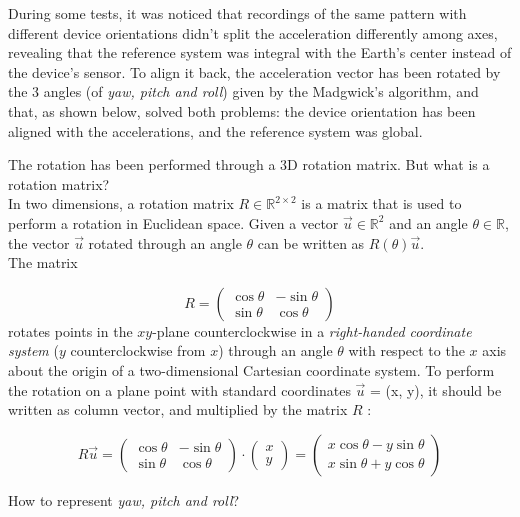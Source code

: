 During some tests, it was noticed that recordings of the same pattern with different device orientations didn't split the acceleration differently among axes, revealing that the reference system was integral with the Earth's center instead of the device's sensor. To align it back, the acceleration vector has been rotated by the 3 angles (of \textit{yaw, pitch and roll}) given by the Madgwick's algorithm, and that, as shown below, solved both problems: the device orientation has been aligned with the accelerations, and the reference system was global.
\bigbreak

The rotation has been performed through a 3D rotation matrix. But what is a rotation matrix?\\
In two dimensions, a rotation matrix $R \in \mathbb R^{2 \times 2}$ is a matrix that is used to perform a rotation in Euclidean space. Given a vector $\vec u \in \mathbb R^2$ and an angle $\theta \in \mathbb R$, the vector $\vec u$ rotated through an angle $\theta$ can be written as $R(\theta) \vec u$.\\
The matrix

\[
	R =
	{\begin{pmatrix}
		\cos \theta & -\sin \theta \\
		\sin \theta & \cos \theta
	\end{pmatrix}}
\]
rotates points in the $xy$-plane counterclockwise in a \textit{right-handed coordinate system} ($y$ counterclockwise from $x$) through an angle $\theta$ with respect to the $x$ axis about the origin of a two-dimensional Cartesian coordinate system. To perform the rotation on a plane point with standard coordinates $\vec u$ = (x, y), it should be written as column vector, and multiplied by the matrix $R$ \cite{WikipediaRotationM}:
\bigbreak

\[
	R \vec u =
	{\begin{pmatrix}
		\cos \theta &-\sin \theta \\
		\sin \theta &\cos \theta
	\end{pmatrix}}
	\cdot
	{\begin{pmatrix}
		x \\
		y
	\end{pmatrix}} =
	{\begin{pmatrix}
		x\cos \theta -y\sin \theta \\
		x\sin \theta +y\cos \theta
	\end{pmatrix}}
\]
\bigbreak

How to represent \textit{yaw, pitch and roll}?
\bigbreak

